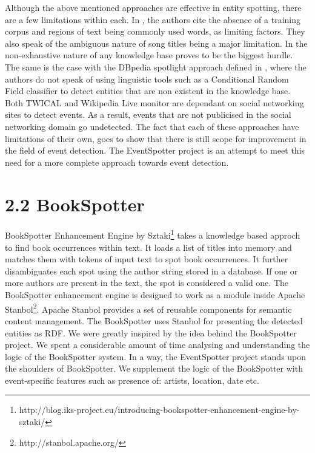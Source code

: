 \documentclass[a4paper,11pt]{report}
\begin{document}
Although the above mentioned approaches are effective in entity spotting, there are a few limitations within each. In \cite{Gruhl_contextand}, the authors cite the absence of a training corpus and regions of text being commonly used words, as limiting factors. They also speak of the ambiguous nature of song titles being a major limitation. In \cite{Hassell06ontology-drivenautomatic} the non-exhaustive nature of any knowledge base proves to be the biggest hurdle. The same is the case with the DBpedia spotlight approach defined in \cite{Mendes11dbpediaspotlight:}, where the authors do not speak of using linguistic tools such as a Conditional Random Field classifier to detect entities that are non existent in the knowledge base. Both TWICAL \cite{Ritter_opendomain} and Wikipedia Live monitor \cite{DBLP:journals/corr/abs-1303-4702} are dependant on social networking sites to detect events. As a result, events that are not publicised in the social networking domain go undetected. The fact that each of these approaches have limitations of their own, goes to show that there is still scope for improvement in the field of event detection. The EventSpotter project is an attempt to meet this need for a more complete approach towards event detection.

\section*{2.2 BookSpotter}

BookSpotter Enhancement Engine by Sztaki\footnote{http://blog.iks-project.eu/introducing-bookspotter-enhancement-engine-by-sztaki/} takes a knowledge based approch to find book occurrences within text. It loads a list of titles into memory and matches them with tokens of input text to spot book occurrences. It further disambiguates each spot using the author string stored in a database. If one or more authors are present in the text, the spot is considered a valid one. The BookSpotter enhancement engine is designed to work as a module inside Apache Stanbol\footnote{http://stanbol.apache.org/}. Apache Stanbol provides a set of reusable components for semantic content management. The BookSpotter uses Stanbol for presenting the detected entities as RDF. We were greatly inspired by the idea behind the BookSpotter project. We spent a considerable amount of time analysing and understanding the logic of the BookSpotter system. In a way, the EventSpotter project stands upon the shoulders of BookSpotter. We supplement the logic of the BookSpotter with event-specific features such as presence of: artists, location, date etc.
\end{document}
